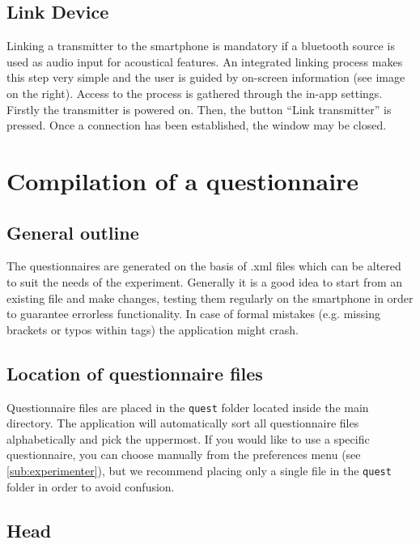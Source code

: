 \documentclass[11pt,a4paper,titlepage]{article}
\begin{document}
\subsection{Link Device}\label{sub:linkdevice}

Linking a transmitter to the smartphone is mandatory if a bluetooth source is used as audio input for acoustical features. An integrated linking process makes this step very simple and the user is guided by on-screen information (see image on the right). Access to the process is gathered through the in-app settings. Firstly the transmitter is powered on. Then, the button ``Link transmitter'' is pressed. Once a connection has been established, the window may be closed.



\section{Compilation of a questionnaire}


\subsection{General outline}

The questionnaires are generated on the basis of .xml files which can be altered to suit the needs of the experiment. Generally it is a good idea to start from an existing file and make changes, testing them regularly on the smartphone in order to guarantee errorless functionality. In case of formal mistakes (e.g. missing brackets or typos within tags) the application might crash. 


\subsection{Location of questionnaire files}

Questionnaire files are placed in the \texttt{quest} folder located inside the main directory. The application will automatically sort all questionnaire files alphabetically and pick the uppermost. If you would like to use a specific questionnaire, you can choose manually from the preferences menu (see \ref{sub:experimenter}), but we recommend placing only a single file in the \texttt{quest} folder in order to avoid confusion. 


\subsection{Head}
\end{document}
